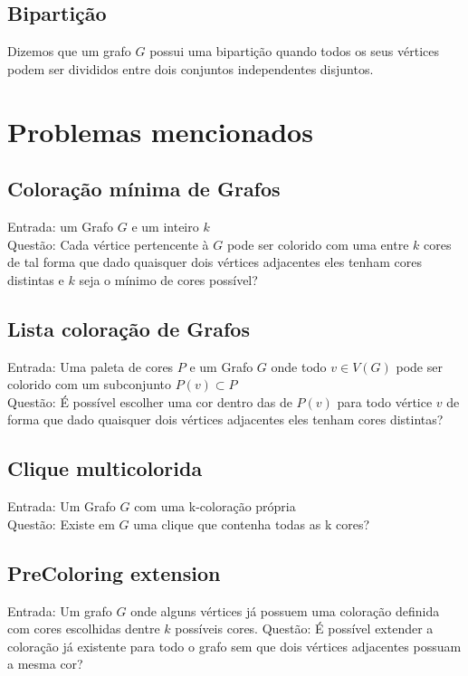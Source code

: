 \subsection{Bipartição}
\begin{definition}
 Dizemos que um grafo $G$ possui uma bipartição quando todos os seus vértices podem ser divididos entre dois conjuntos independentes disjuntos.
\end{definition}

\section{Problemas mencionados}

\subsection{Coloração mínima de Grafos}
\begin{definition}
	Entrada: um Grafo $G$ e um inteiro $k$\\
	Questão: Cada vértice pertencente à $G$ pode ser colorido com uma entre $k$ cores
	de tal forma que dado quaisquer dois vértices adjacentes eles tenham cores distintas e $k$ seja o mínimo de cores possível?
\end{definition}

\subsection{Lista coloração de Grafos}
\begin{definition}
  Entrada: Uma paleta de cores $P$ e um Grafo $G$ onde todo $v \in V(G)$ pode ser colorido com um subconjunto $P(v) \subset P$\\
  Questão: É possível escolher uma cor dentro das de $P(v)$ para todo vértice $v$ de forma que dado quaisquer dois vértices adjacentes eles tenham cores distintas?
\end{definition}

\subsection{Clique multicolorida}
\begin{definition}
 Entrada: Um Grafo $G$ com uma k-coloração própria\\
 Questão: Existe em $G$ uma clique que contenha todas as k cores?
\end{definition}

\subsection{PreColoring extension}
\begin{definition}
 Entrada: Um grafo $G$ onde alguns vértices já possuem uma coloração definida com cores escolhidas dentre $k$ possíveis cores.
 Questão: É possível extender a coloração já existente para todo o grafo sem que dois vértices adjacentes possuam a mesma cor? 
\end{definition}

